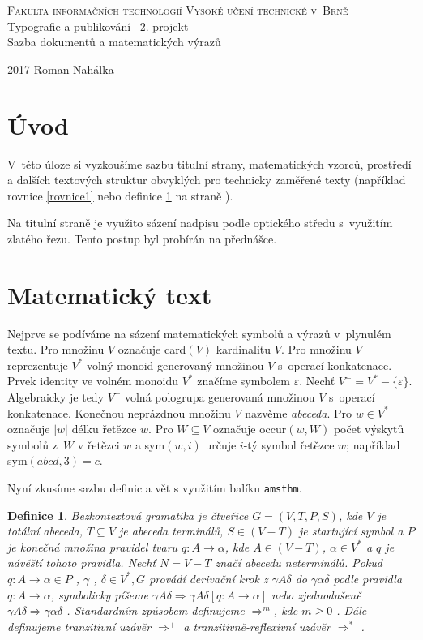 \documentclass[a4paper, 11pt, twocolumn]{article}
\newtheorem{definice}{Definice}[section]
\begin{document}
\begin{titlepage}
\begin{center}
{\Huge \textsc{Fakulta informačních technologií Vysoké učení technické v~Brně\\}}
{\LARGE Typografie a publikování\,--\,2. projekt\\Sazba dokumentů a matematických výrazů}
\end{center}
{\Large 2017 \hfill Roman Nahálka}
\end{titlepage}
\section*{Úvod}
V~této úloze si vyzkoušíme sazbu titulní strany, matematických vzorců, prostředí a dalších textových struktur obvyklých pro technicky zaměřené texty (například rovnice \ref{rovnice1} nebo definice \ref{Definice 1.1.} na straně \pageref{Definice 1.1.}).

Na titulní straně je využito sázení nadpisu podle optického středu s~využitím zlatého řezu. Tento postup byl probírán na přednášce.
\section{Matematický text}
Nejprve se podíváme na sázení matematických symbolů a výrazů v~plynulém textu. Pro množinu $V$ označuje card$(V)$ kardinalitu $V$.
Pro množinu $V$ reprezentuje $V^*$ volný monoid generovaný množinou $V$ s~operací konkatenace.
Prvek identity ve volném monoidu $V^*$ značíme symbolem $\varepsilon$.
Nechť $V^+ = V^* - \{{\varepsilon}\}$. Algebraicky je tedy $V^+$ volná pologrupa generovaná množinou $V$ s~operací konkatenace.
Konečnou neprázdnou množinu $V$ nazvěme \emph{abeceda}.
Pro $w \in V^*$ označuje $|w|$ délku řetězce $w$. Pro $W \subseteq V$ označuje occur$(w,W)$ počet výskytů symbolů z~$W$ v řetězci $w$ a sym$(w,i)$ určuje $i$-tý symbol řetězce $w$; například sym$(abcd,3)=c$.

Nyní zkusíme sazbu definic a vět s využitím balíku \texttt{amsthm}.
\begin{definice}
\label{Definice 1.1.}Bezkontextová gramatika \emph{je čtveřice $G=(V,T,P,S)$, kde $V$ je totální abeceda,
$T \subseteq V$ je abeceda terminálů, $S \in (V - T)$ je startující symbol a $P$ je konečná množina} pravidel
\emph{tvaru $q\colon A \rightarrow \alpha$, kde $A \in (V - T)$, $\alpha \in V^*$ a $q$ je návěští tohoto pravidla. Nechť $N = V - T$ značí abecedu neterminálů.
Pokud $q\colon A \rightarrow \alpha \in P$ , $\gamma$ , $\delta \in V^*,G$ provádí derivační krok z ${\gamma}A{\delta}$ do ${\gamma}{\alpha}{\delta}$ podle pravidla $q\colon A \rightarrow \alpha$, symbolicky píšeme 
${\gamma}A{\delta} \Rightarrow {\gamma}A{\delta} [q\colon A \rightarrow \alpha]$ nebo zjednodušeně ${\gamma}A{\delta} \Rightarrow {\gamma}{\alpha}{\delta}$ . Standardním způsobem definujeme $\Rightarrow^m$, kde $m \geq 0$ . Dále definujeme 
tranzitivní uzávěr $\Rightarrow^+$ a tranzitivně-reflexivní uzávěr $\Rightarrow^*$ .}
\end{definice}
\end{document}
